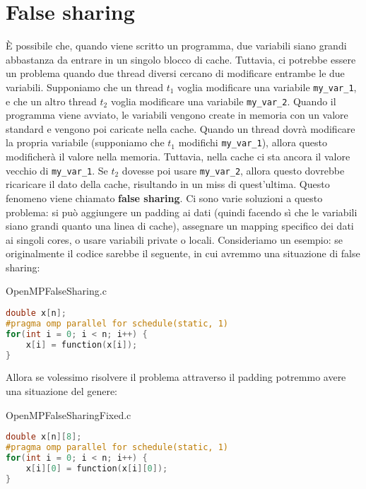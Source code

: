 
\section{False sharing}

È possibile che, quando viene scritto un programma, due variabili siano grandi abbastanza da entrare in un singolo blocco di cache. Tuttavia, ci potrebbe essere un problema quando due thread diversi cercano di modificare entrambe le due variabili.
\nl
Supponiamo che un thread $t_1$ voglia modificare una variabile \verb|my_var_1|, e che un altro thread $t_2$ voglia modificare una variabile \verb|my_var_2|. Quando il programma viene avviato, le variabili vengono create in memoria con un valore standard e vengono poi caricate nella cache.
\nl
Quando un thread dovrà modificare la propria variabile (supponiamo che $t_1$ modifichi \verb|my_var_1|), allora questo modificherà il valore nella memoria. Tuttavia, nella cache ci sta ancora il valore vecchio di \verb|my_var_1|. Se $t_2$ dovesse poi usare \verb|my_var_2|, allora questo dovrebbe ricaricare il dato della cache, risultando in un miss di quest'ultima. Questo fenomeno viene chiamato \textbf{false sharing}.
\nl
Ci sono varie soluzioni a questo problema: si può aggiungere un padding ai dati (quindi facendo sì che le variabili siano grandi quanto una linea di cache), assegnare un mapping specifico dei dati ai singoli cores, o usare variabili private o locali. Consideriamo un esempio: se originalmente il codice sarebbe il seguente, in cui avremmo una situazione di false sharing:

\begin{codeblock}{OpenMPFalseSharing.c}
    \begin{lstlisting}[language = C]
double x[n];
#pragma omp parallel for schedule(static, 1)
for(int i = 0; i < n; i++) {
    x[i] = function(x[i]);
}\end{lstlisting}
\end{codeblock}

Allora se volessimo risolvere il problema attraverso il padding potremmo avere una situazione del genere:

\begin{codeblock}{OpenMPFalseSharingFixed.c}
    \begin{lstlisting}[language = C]
double x[n][8];
#pragma omp parallel for schedule(static, 1)
for(int i = 0; i < n; i++) {
    x[i][0] = function(x[i][0]);
}\end{lstlisting}
\end{codeblock}

